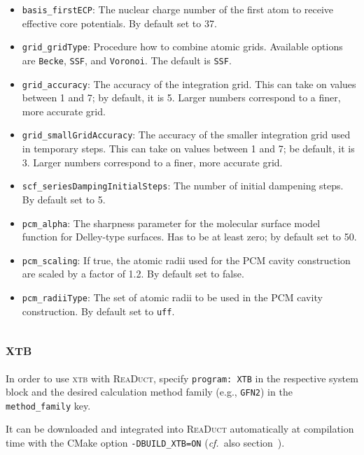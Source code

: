 \documentclass[]{tufte-book}
\begin{document}
\begin{itemize}
\item \texttt{basis\_firstECP}: The nuclear charge number of the first atom to receive effective core potentials. By default set to 37.
\item \texttt{grid\_gridType}: Procedure how to combine atomic grids. Available options are \texttt{Becke}\cite{Becke1988}, \texttt{SSF}\cite{Stratmann1996}, and \texttt{Voronoi}. The default is \texttt{SSF}.
\item \texttt{grid\_accuracy}: The accuracy of the integration grid. This can take on values between 1 and 7; by default, it is 5. Larger numbers correspond to a finer, more accurate grid.
\item \texttt{grid\_smallGridAccuracy}: The accuracy of the smaller integration grid used in temporary steps. This can take on values between 1 and 7; be default, it is 3. Larger numbers correspond to a finer, more accurate grid.
\item \texttt{scf\_seriesDampingInitialSteps}: The number of initial dampening steps. By default set to 5.
\item \texttt{pcm\_alpha}: The sharpness parameter for the molecular surface model function for Delley-type surfaces. Has to be at least zero; by default set to 50.
\item \texttt{pcm\_scaling}: If true, the atomic radii used for the PCM cavity construction are scaled by a factor of 1.2. By default set to false.
\item \texttt{pcm\_radiiType}: The set of atomic radii to be used in the PCM cavity construction. By default set to \texttt{uff}.
\end{itemize}


\subsection{\textsc{xtb}}

In order to use \textsc{xtb} with \textsc{ReaDuct}, specify \texttt{program: XTB} in the respective system block and the desired
calculation method family (e.g., \texttt{GFN2}) in the \texttt{method\_family} key.

It can be downloaded and integrated into \textsc{ReaDuct} automatically at compilation time with the CMake option \texttt{-DBUILD\_XTB=ON} (\textit{cf.}~also section~).
\end{document}
